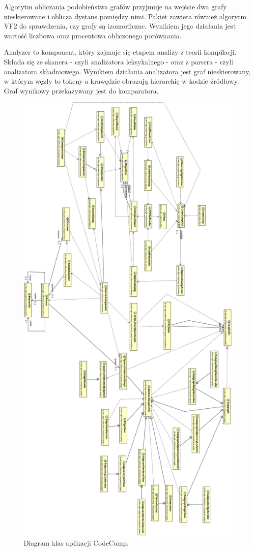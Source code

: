 \documentclass[a4paper,12pt]{article}
\begin{document}
Algorytm obliczania podobieństwa grafów przyjmuje na wejście dwa grafy nieskierowane i oblicza dystans pomiędzy nimi. Pakiet zawiera również algorytm VF2 do sprawdzenia, czy grafy są izomorficzne. Wynikiem jego działania jest wartość liczbowa oraz procentowa obliczonego porównania.

Analyzer to komponent, który zajmuje się etapem analizy z teorii kompilacji. Składa się ze skanera - czyli analizatora leksykalnego - oraz z parsera - czyli analizatora składniowego. Wynikiem działania analizatora jest graf nieskierowany, w którym węzły to tokeny a krawędzie obrazują hierarchię w kodzie źródłowy. Graf wynikowy przekazywany jest do komparatora.

\begin{figure}[!]
\centering
\includegraphics[scale=0.3]{gfx/ClassDiagram2.png}
\caption{Diagram klas aplikacji CodeComp.}
\end{figure}
\end{document}
